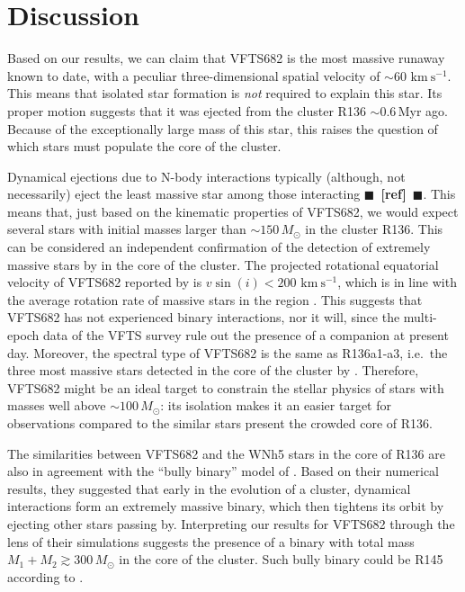 \documentclass[apjl,twocolumn]{emulateapj}
\newcommand{\todo}[1]{{\large $\blacksquare$~\textbf{\color{red}[#1]}}~$\blacksquare$}
\newcommand{\kms}{{\,\mathrm{km\ s^{-1}}}}
\begin{document}
\section{Discussion}
\label{sec:discussion}

Based on our results, we can claim that VFTS682 is the most massive
runaway known to date, with a peculiar three-dimensional spatial
velocity of $\sim$$60\,\kms$. This means that isolated star formation is
\emph{not} required to explain this star. Its proper motion suggests that it was ejected from the cluster R136
$\sim$$0.6$\,Myr ago. Because of the exceptionally large mass
of this star, this raises the question of which stars must populate
the core of the cluster.

Dynamical ejections due to N-body interactions typically (although, not necessarily) eject the least
massive star among those interacting \todo{ref}. This means that, just
based on the kinematic properties of VFTS682, we would expect several
stars with initial masses larger than $\sim$$150\,M_\odot$ in the
cluster R136.
This can be considered an independent confirmation of the detection
of extremely massive stars by \cite{crowther:10} in the core of the
cluster. The projected rotational equatorial velocity of VFTS682
reported by \cite{schneider:18} is $v\sin(i)<200\,\kms$, which is in
line with the average rotation rate of massive stars in the region
\citep[][]{ramirez-agudelo:15}. This suggests that VFTS682 has not
experienced binary interactions, nor it will, since the multi-epoch
data of the VFTS survey rule out the presence of a companion at
present day. Moreover, the spectral type of VFTS682
\citep[WNh5,][]{bestenlehner:11} is the same as R136a1-a3, i.e.~the
three most massive stars detected in the core of the cluster by
\cite{crowther:10}. Therefore,
VFTS682 might be an ideal target to constrain the stellar physics of
stars with masses well above $\sim100\,M_\odot$: its isolation makes
it an easier target for observations compared to the similar stars present the crowded core of R136.

The similarities between VFTS682 and the WNh5 stars in the core of
R136 are also in agreement with the ``bully binary'' model of
\cite{fujii:11}. Based on their numerical results, they suggested that
early in the evolution of a cluster, dynamical interactions form an extremely
massive binary, which then tightens its orbit by ejecting other stars passing
by. Interpreting our results for VFTS682 through the lens of their simulations
suggests the presence of a binary with total mass
$M_1+M_2\gtrsim 300\,M_\odot$ in the core of the cluster. Such bully
binary could be R145 according to \cite{fujii:11}.
\end{document}
